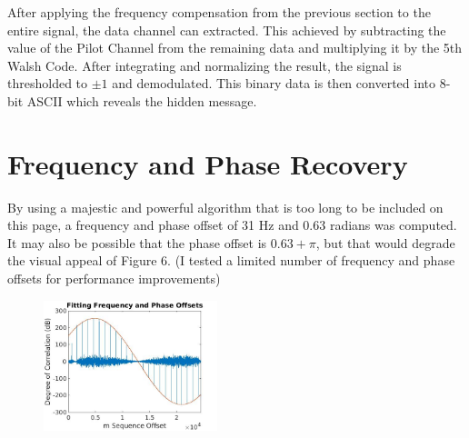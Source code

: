 \documentclass[twocolumn]{article}
\begin{document}
After applying the frequency compensation from the previous section to the entire signal, the data channel can extracted. This achieved by subtracting the value of the Pilot Channel from the remaining data and multiplying it by the 5th Walsh Code. After integrating and normalizing the result, the signal is thresholded to $\pm 1$ and demodulated. This binary data is then converted into 8-bit ASCII which reveals the hidden message.

\section{Frequency and Phase Recovery}

By using a majestic and powerful algorithm that is too long to be included on this page, a frequency and phase offset of 31 Hz and 0.63 radians was computed. It may also be possible that the phase offset is $0.63 + \pi$, but that would degrade the visual appeal of Figure 6. (I tested a limited number of frequency and phase offsets for performance improvements) 

\begin{figure}[h]
    \centering
    \includegraphics[width=0.45\textwidth]{FPfit.jpg}
    \caption{}
    \label{fig}
\end{figure}

 
\end{document}
